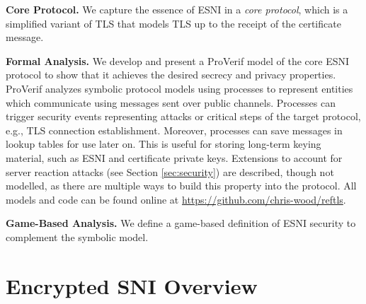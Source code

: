 \documentclass{article}
\theoremstyle{definition}
\begin{document}
\textbf{Core Protocol.} We capture the essence of ESNI in a \emph{core protocol}, which is a simplified variant
of TLS that models TLS up to the receipt of the certificate message.

\textbf{Formal Analysis.} We develop and present a ProVerif model of the core ESNI protocol to show that it
achieves the desired secrecy and privacy properties.  ProVerif analyzes symbolic protocol models using 
processes to represent entities which communicate using messages sent over public channels. Processes
can trigger security events representing attacks or critical steps of the target protocol, e.g., TLS connection establishment.
Moreover, processes can save messages in lookup tables for use later on. This is useful for storing long-term keying
material, such as ESNI and certificate private keys. Extensions to account for server reaction attacks 
(see Section \ref{sec:security}) are described, though not modelled, as there are multiple ways to build 
this property into the protocol. All models and code can be found online at \url{https://github.com/chris-wood/reftls}.

\textbf{Game-Based Analysis.} We define a game-based definition of ESNI security to complement the symbolic model.

\section{Encrypted SNI Overview}

\end{document}
